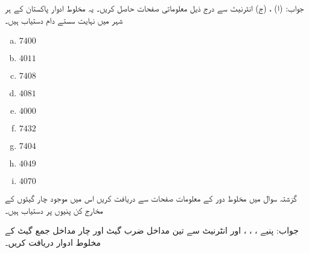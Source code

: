 جواب: (ا) ، (ج) 
انٹرنیٹ  سے درج ذیل معلوماتی صفحات  حاصل کریں۔ یہ مخلوط ادوار پاکستان کے ہر شہر میں نہایت سستے دام  دستیاب ہیں۔
\begin{multicols}{5}
\begin{enumerate}[a.]
\item
 \( 7400 \) 
 \item
  \( 4011  \)
  \item
  \( 7408  \)
  \item
  \(  4081  \)
  \item
  \( 4000  \)
  \item
  \( 7432  \)
  \item
  \( 7404  \)
  \item
  \( 4049  \)
  \item
  \( 4070  \)
\end{enumerate}
\end{multicols}
گزشتہ سوال میں  مخلوط دور  کے  معلومات صفحات سے   دریافت کریں اس میں موجود  چار گیٹوں کے مخارج کن پنیوں پر دستیاب ہیں۔

جواب: پنیے ، ، ، اور 
انٹرنیٹ سے تین مداخل  ضرب گیٹ اور چار مداخل جمع گیٹ کے مخلوط ادوار دریافت کریں۔

